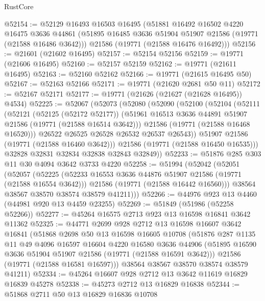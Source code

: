 \begin{lexlean}{RustCore}
\begin{coremodule}
@52154 := @52129
    @16493
    @16503
    @16495
    (@51881
      @16492
      @16502
      @4220
      @16475
      @3636
      @44861
      (@51895 @16485 @3636 @51904 @51907 @21586 (@19771 (@21588 @16486 @3642)))
      @21586
      (@19771 (@21588 @16476 @16492)))
@52156 := @21601 (@21602 @16495)
@52157 := @52154 @52156
@52159 := @19771 (@21606 @16495)
@52160 := @52157 @52159
@52162 := @19771 (@21611 @16495)
@52163 := @52160 @52162
@52166 := @19771 (@21615 @16495 @50)
@52167 := @52163 @52166
@52171 := @19771 (@21620 @2681 @50 @11)
@52172 := @52167 @52171
@52177 := @19771 (@21626 (@21627 (@21628 @16495)) @4534)
@52225 := @52067
    (@52073
      (@52080
        (@52090
          (@52100
            (@52104
              (@52111
                (@52121
                  (@52125 (@52172 @52177))
                  (@51961 @16513 @3636 @44891 @51907 @21586 (@19771 (@21588 @16514 @3642)))
                  @21586
                  (@19771 (@21588 @16468 @16520)))
                @26522
                @26525
                @26528
                @26532
                @26537
                @26543))
            @51907
            @21586
            (@19771 (@21588 @16460 @3642)))
          @21586
          (@19771 (@21588 @16450 @16535)))
        @32828
        @32831
        @32834
        @32838
        @32843
        @32849))
@52233 := @51876 @285 @303 @11 @30 @4094 @3642 @3733 @4220
@52258 := @51994
    (@52042
      (@52051
        (@52057
          (@52225
            (@52233 @16553 @3636 @44876 @51907 @21586 (@19771 (@21588 @16554 @3642)))
            @21586
            (@19771 (@21588 @16442 @16560)))
          @38564
          @38567
          @38570
          @38574
          @38579
          @41211)))
@52266 := @44976 @923 @13 @4460 (@44981 @920 @13 @4459 @23255)
@52269 := @51849 (@51986 (@52258 @52266))
@52277 := @45264 @16575 @2713 @923 @13 @16598 @16841 @3642 @11362
@52325 := @44771
    @2699
    @928
    @2712
    @13
    @16598
    @16607
    @3642
    @16841
    (@51868
      @2698
      @50
      @13
      @16598
      @16605
      @10708
      (@51876
        @287
        @1135
        @11
        @49
        @4096
        @16597
        @16604
        @4220
        @16580
        @3636
        @44906
        (@51895 @16590 @3636 @51904 @51907 @21586 (@19771 (@21588 @16591 @3642)))
        @21586
        (@19771 (@21588 @16581 @16597)))
      @38564
      @38567
      @38570
      @38574
      @38579
      @41211)
@52334 := @45264 @16607 @928 @2712 @13 @3642 @11619 @16829 @16839 @45278
@52338 := @45273 @2712 @13 @16829 @16838
@52344 := @51868 @2711 @50 @13 @16829 @16836 @10708

\end{coremodule}
\end{lexlean}
